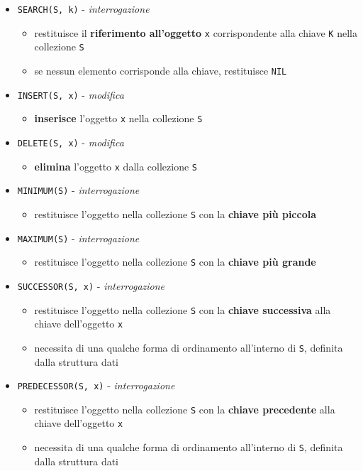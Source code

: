 \documentclass[italian, 10pt]{article}
\begin{document}
\begin{itemize}
  \item \texttt{SEARCH(S, k)} - \textit{interrogazione}
        \begin{itemize}
          \item restituisce il \textbf{riferimento all'oggetto} \texttt{x} corrispondente alla chiave \texttt{K} nella collezione \texttt{S}
          \item se nessun elemento corrisponde alla chiave, restituisce \texttt{NIL}
        \end{itemize}
  \item \texttt{INSERT(S, x)} - \textit{modifica}
        \begin{itemize}
          \item \textbf{inserisce} l'oggetto \texttt{x} nella collezione \texttt{S}
        \end{itemize}
  \item \texttt{DELETE(S, x)} - \textit{modifica}
        \begin{itemize}
          \item \textbf{elimina} l'oggetto \texttt{x} dalla collezione \texttt{S}
        \end{itemize}
  \item \texttt{MINIMUM(S)} - \textit{interrogazione}
        \begin{itemize}
          \item restituisce l'oggetto nella collezione \texttt{S} con la \textbf{chiave più piccola}
        \end{itemize}
  \item \texttt{MAXIMUM(S)} - \textit{interrogazione}
        \begin{itemize}
          \item restituisce l'oggetto nella collezione \texttt{S} con la \textbf{chiave più grande}
        \end{itemize}
  \item \texttt{SUCCESSOR(S, x)} - \textit{interrogazione}
        \begin{itemize}
          \item restituisce l'oggetto nella collezione \texttt{S} con la \textbf{chiave successiva} alla chiave dell'oggetto \texttt{x}
          \item necessita di una qualche forma di ordinamento all'interno di \texttt{S}, definita dalla struttura dati
        \end{itemize}
  \item \texttt{PREDECESSOR(S, x)} - \textit{interrogazione}
        \begin{itemize}
          \item restituisce l'oggetto nella collezione \texttt{S} con la \textbf{chiave precedente} alla chiave dell'oggetto \texttt{x}
          \item necessita di una qualche forma di ordinamento all'interno di \texttt{S}, definita dalla struttura dati
        \end{itemize}
\end{itemize}
\end{document}
